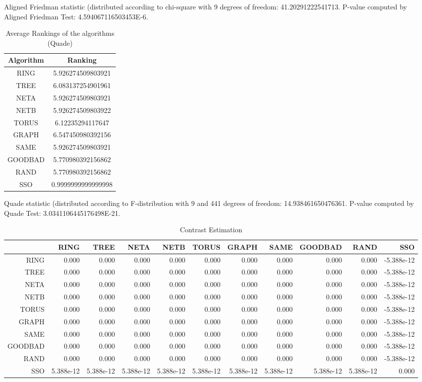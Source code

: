 \documentclass[a4paper,10pt]{article}
\begin{document}
\begin{landscape}
Aligned Friedman statistic (distributed according to chi-square with 9 degrees of freedom: 41.20291222541713. 
P-value computed by Aligned Friedman Test: 4.594067116503453E-6.\newline


\newpage

\begin{table}[!htp]
\centering
\caption{Average Rankings of the algorithms (Quade)
}\begin{tabular}{c|c}
Algorithm&Ranking\\
\hline
 RING&5.926274509803921\\
 TREE&6.083137254901961\\
 NETA&5.926274509803921\\
 NETB&5.926274509803922\\
 TORUS&6.12235294117647\\
 GRAPH&6.547450980392156\\
 SAME&5.926274509803921\\
 GOODBAD&5.770980392156862\\
 RAND&5.770980392156862\\
 SSO&0.9999999999999998\\
\end{tabular}
\end{table}
Quade statistic (distributed according to F-distribution with 9 and 441 degrees of freedom: 14.938461650476361. 
P-value computed by Quade Test: 3.0341106445176498E-21.\newline


\newpage

\begin{table}[!htp]
\centering\tiny
\caption{Contrast Estimation}
\begin{tabular}{
|r|r|r|r|r|r|r|r|r|r|r|}
\hline
 & RING& TREE& NETA& NETB& TORUS& GRAPH& SAME& GOODBAD& RAND& SSO\\
\hline
 RING&0.000&0.000&0.000&0.000&0.000&0.000&0.000&0.000&0.000&-5.388e-12\\
\hline
 TREE&0.000&0.000&0.000&0.000&0.000&0.000&0.000&0.000&0.000&-5.388e-12\\
\hline
 NETA&0.000&0.000&0.000&0.000&0.000&0.000&0.000&0.000&0.000&-5.388e-12\\
\hline
 NETB&0.000&0.000&0.000&0.000&0.000&0.000&0.000&0.000&0.000&-5.388e-12\\
\hline
 TORUS&0.000&0.000&0.000&0.000&0.000&0.000&0.000&0.000&0.000&-5.388e-12\\
\hline
 GRAPH&0.000&0.000&0.000&0.000&0.000&0.000&0.000&0.000&0.000&-5.388e-12\\
\hline
 SAME&0.000&0.000&0.000&0.000&0.000&0.000&0.000&0.000&0.000&-5.388e-12\\
\hline
 GOODBAD&0.000&0.000&0.000&0.000&0.000&0.000&0.000&0.000&0.000&-5.388e-12\\
\hline
 RAND&0.000&0.000&0.000&0.000&0.000&0.000&0.000&0.000&0.000&-5.388e-12\\
\hline
 SSO&5.388e-12&5.388e-12&5.388e-12&5.388e-12&5.388e-12&5.388e-12&5.388e-12&5.388e-12&5.388e-12&0.000\\
\hline


\end{tabular}
\end{table}
\end{landscape}
\end{document}
